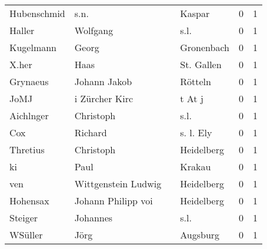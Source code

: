 \begin{tabular}{llllrr}
              Hubenschmid &                               s.n. &             &                                      Kaspar &          0 &         1 \\
                   Haller &                           Wolfgang &             &                                        s.l. &          0 &         1 \\
                Kugelmann &                              Georg &             &                                  Gronenbach &          0 &         1 \\
                    X.her &                               Haas &             &                                  St. Gallen &          0 &         1 \\
                 Grynaeus &                       Johann Jakob &             &                                     Rötteln &          0 &         1 \\
                     JoMJ &                     i Zürcher Kirc &             &                                      t At j &          0 &         1 \\
                Aichlnger &                          Christoph &             &                                        s.l. &          0 &         1 \\
                      Cox &                            Richard &             &                                   s. l. Ely &          0 &         1 \\
                 Thretius &                          Christoph &             &                                  Heidelberg &          0 &         1 \\
                       ki &                               Paul &             &                                      Krakau &          0 &         1 \\
                      ven &                Wittgenstein Ludwig &             &                                  Heidelberg &          0 &         1 \\
                 Hohensax &                 Johann Philipp voi &             &                                  Heidelberg &          0 &         1 \\
                  Steiger &                           Johannes &             &                                        s.l. &          0 &         1 \\
                  WSüller &                               Jörg &             &                                    Augsburg &          0 &         1 \\

\end{tabular}
